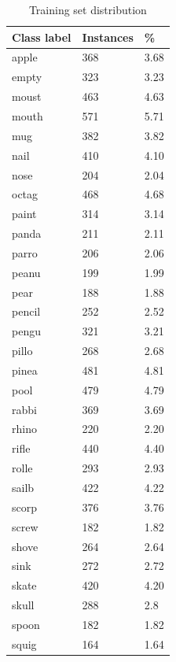 \documentclass[reqno]{amsart}
\begin{document}
\begin{table}[htp]
\caption {Training set distribution} \label{fig:data}
\begin{center}
\begin{tabular}{|l|l|l|}
    \hline
    Class label & Instances & \% \\
    \hline
    apple & 368	& 3.68\\
    empty &	323 & 3.23\\
    moust & 463	& 4.63\\
    mouth &	571 & 5.71\\
    mug & 382 & 3.82\\
    nail & 410 & 4.10\\
    nose & 204 & 2.04\\
    octag & 468 & 4.68\\
    paint & 314 & 3.14\\
    panda & 211 & 2.11\\
    parro & 206 & 2.06\\
    peanu & 199 & 1.99\\
    pear & 188 & 1.88\\
    pencil & 252 & 2.52\\
    pengu & 321 & 3.21\\
    pillo & 268 & 2.68\\
    pinea & 481 & 4.81\\
    pool & 479 & 4.79\\
    rabbi & 369 & 3.69\\
    rhino & 220 & 2.20\\
    rifle & 440 & 4.40\\
    rolle & 293 & 2.93\\
    sailb & 422 & 4.22\\
    scorp & 376 & 3.76\\
    screw & 182 & 1.82\\
    shove & 264 & 2.64\\
    sink & 272 & 2.72\\
    skate & 420 & 4.20\\
    skull & 288 & 2.8\\
    spoon & 182 & 1.82\\
    squig & 164 & 1.64\\
     \hline
\end{tabular}
\end{center}
\end{table}
\end{document}
